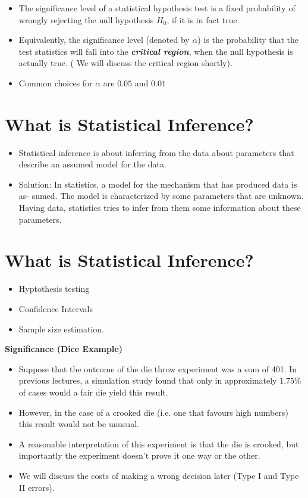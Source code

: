 \documentclass[]{report}
\begin{document}
\begin{itemize}
\item The significance level of a statistical hypothesis test is a fixed probability of wrongly rejecting the null hypothesis $H_0$, if it is in fact true.

\item Equivalently, the significance level (denoted by $\alpha$) is the probability that the test statistics will fall into the \textbf{\emph{critical region}}, when the null hypothesis is actually true. ( We will discuss the critical region shortly).

\item Common choices for $\alpha$ are $0.05$ and $0.01$
\end{itemize}


\section{ What is Statistical Inference?}

\begin{itemize}
\item Statistical inference is about inferring from the data about parameters that describe an assumed
model for the data.
\item 
Solution: In statistics, a model for the mechanism that has produced data is as-
sumed. The model is characterized by some parameters that are unknown. Having
data, statistics tries to infer from them some information about these parameters.
\end{itemize}
\section{What is Statistical Inference?}
\begin{itemize}
\item Hyptothesis testing 
\item Confidence Intervals 
\item Sample size estimation.
\end{itemize}






\textbf{Significance (Dice Example)}
\begin{itemize}
\item Suppose that the outcome of the die throw experiment was a sum of 401. In previous lectures, a simulation study found that only in approximately $1.75\%$ of cases would a fair die yield this result.
\item However, in the case of a crooked die (i.e. one that favours high numbers) this result would not be unusual.
\item A reasonable interpretation of this experiment is that the die is crooked, but importantly the experiment doesn't prove it one way or the other.
\item We will discuss the costs of making a wrong decision later (Type I and Type II errors).
\end{itemize}

\end{document}
